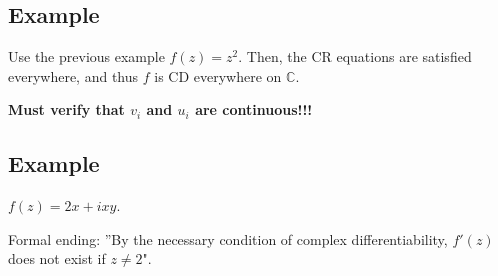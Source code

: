 \documentclass{article}
\newtheorem{one minute paper}[theorem]{One Minute Paper}
\begin{document}
\subsection*{Example}

Use the previous example $f(z) = z^2$. Then, the CR equations are satisfied everywhere, and thus $f$ is CD everywhere on $\mathbb{C}$. 

\textbf{Must verify that $v_i$ and $u_i$ are continuous!!!}

\subsection*{Example}

$f(z) = 2x + ixy$. 

Formal ending: ''By the necessary condition of complex differentiability, $f'(z)$ does not exist if $z \neq 2$". 
\end{document}
